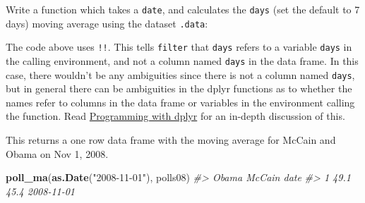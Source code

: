 \documentclass[]{book}
\newenvironment{Shaded}{\begin{snugshade}}{\end{snugshade}}
\newcommand{\CommentTok}[1]{\textcolor[rgb]{0.56,0.35,0.01}{\textit{#1}}}
\newcommand{\ControlFlowTok}[1]{\textcolor[rgb]{0.13,0.29,0.53}{\textbf{#1}}}
\newcommand{\DataTypeTok}[1]{\textcolor[rgb]{0.13,0.29,0.53}{#1}}
\newcommand{\DecValTok}[1]{\textcolor[rgb]{0.00,0.00,0.81}{#1}}
\newcommand{\KeywordTok}[1]{\textcolor[rgb]{0.13,0.29,0.53}{\textbf{#1}}}
\newcommand{\NormalTok}[1]{#1}
\newcommand{\OperatorTok}[1]{\textcolor[rgb]{0.81,0.36,0.00}{\textbf{#1}}}
\newcommand{\OtherTok}[1]{\textcolor[rgb]{0.56,0.35,0.01}{#1}}
\newcommand{\StringTok}[1]{\textcolor[rgb]{0.31,0.60,0.02}{#1}}
\theoremstyle{definition}
\theoremstyle{definition}
\theoremstyle{definition}
\theoremstyle{remark}
\begin{document}
Write a function which takes a \texttt{date}, and calculates the
\texttt{days} (set the default to 7 days) moving average using the
dataset \texttt{.data}:

\begin{Shaded}
\end{Shaded}

The code above uses \texttt{!!}. This tells \texttt{filter} that
\texttt{days} refers to a variable \texttt{days} in the calling
environment, and not a column named \texttt{days} in the data frame. In
this case, there wouldn't be any ambiguities since there is not a column
named \texttt{days}, but in general there can be ambiguities in the
dplyr functions as to whether the names refer to columns in the data
frame or variables in the environment calling the function. Read
\href{http://dplyr.tidyverse.org/articles/programming.html}{Programming
with dplyr} for an in-depth discussion of this.

This returns a one row data frame with the moving average for McCain and
Obama on Nov 1, 2008.

\begin{Shaded}
\begin{Highlighting}[]
\KeywordTok{poll_ma}\NormalTok{(}\KeywordTok{as.Date}\NormalTok{(}\StringTok{"2008-11-01"}\NormalTok{), polls08)}
\CommentTok{#>   Obama McCain       date}
\CommentTok{#> 1  49.1   45.4 2008-11-01}
\end{Highlighting}
\end{Shaded}
\end{document}
